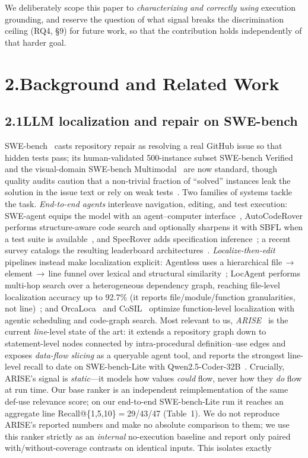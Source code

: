 \documentclass[11pt]{article}
\begin{document}
We deliberately scope this paper to \emph{characterizing and correctly using} execution grounding, and reserve the question of what signal breaks the discrimination ceiling (RQ4, \S9) for future work, so that the contribution holds independently of that harder goal.

\section*{2.\quad Background and Related Work}

\subsection*{2.1\quad LLM localization and repair on SWE-bench}
SWE-bench~\citep{swebench} casts repository repair as resolving a real GitHub issue so that hidden tests pass; its human-validated 500-instance subset SWE-bench Verified~\citep{swebench_verified} and the visual-domain SWE-bench Multimodal~\citep{swebench_mm} are now standard, though quality audits caution that a non-trivial fraction of ``solved'' instances leak the solution in the issue text or rely on weak tests~\citep{swebench_plus}. Two families of systems tackle the task. \emph{End-to-end agents} interleave navigation, editing, and test execution: SWE-agent equips the model with an agent--computer interface~\citep{sweagent}, AutoCodeRover performs structure-aware code search and optionally sharpens it with SBFL when a test suite is available~\citep{autocoderover}, and SpecRover adds specification inference~\citep{specrover}; a recent survey catalogs the resulting leaderboard architectures~\citep{dissecting}. \emph{Localize-then-edit} pipelines instead make localization explicit: Agentless uses a hierarchical file\,$\rightarrow$\,element\,$\rightarrow$\,line funnel over lexical and structural similarity~\citep{agentless}; LocAgent performs multi-hop search over a heterogeneous dependency graph, reaching file-level localization accuracy up to 92.7\% (it reports file/module/function granularities, not line)~\citep{locagent}; and OrcaLoca~\citep{orcaloca} and CoSIL~\citep{cosil} optimize function-level localization with agentic scheduling and code-graph search. Most relevant to us, \emph{ARISE}~\citep{arise} is the current \emph{line}-level state of the art: it extends a repository graph down to statement-level nodes connected by intra-procedural definition--use edges and exposes \emph{data-flow slicing} as a queryable agent tool, and reports the strongest line-level recall to date on SWE-bench-Lite with Qwen2.5-Coder-32B~\citep{qwen25coder}. Crucially, ARISE's signal is \emph{static}---it models how values \emph{could} flow, never how they \emph{do} flow at run time. Our base ranker is an independent reimplementation of the same def-use relevance score; on our end-to-end SWE-bench-Lite run it reaches an aggregate line Recall@\{1,5,10\}$=$29/43/47 (Table~1). We do not reproduce ARISE's reported numbers and make no absolute comparison to them; we use this ranker strictly as an \emph{internal} no-execution baseline and report only paired with/without-coverage contrasts on identical inputs. This isolates exactly 
\end{document}
